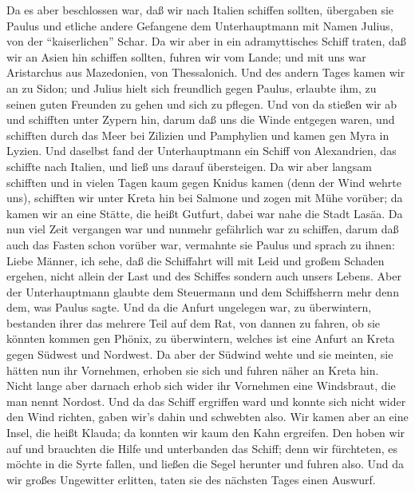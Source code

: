  Da es aber beschlossen war, daß wir nach Italien schiffen
sollten, übergaben sie Paulus und etliche andere Gefangene dem
Unterhauptmann mit Namen Julius, von der ``kaiserlichen'' Schar.
 Da wir aber in ein adramyttisches Schiff traten, daß wir an
Asien hin schiffen sollten, fuhren wir vom Lande; und mit uns war
Aristarchus aus Mazedonien, von Thessalonich.  Und des
andern Tages kamen wir an zu Sidon; und Julius hielt sich freundlich
gegen Paulus, erlaubte ihm, zu seinen guten Freunden zu gehen und sich
zu pflegen.  Und von da stießen wir ab und schifften unter
Zypern hin, darum daß uns die Winde entgegen waren,  und
schifften durch das Meer bei Zilizien und Pamphylien und kamen gen Myra
in Lyzien.  Und daselbst fand der Unterhauptmann ein Schiff
von Alexandrien, das schiffte nach Italien, und ließ uns darauf
übersteigen.  Da wir aber langsam schifften und in vielen
Tagen kaum gegen Knidus kamen (denn der Wind wehrte uns), schifften wir
unter Kreta hin bei Salmone  und zogen mit Mühe vorüber; da
kamen wir an eine Stätte, die heißt Gutfurt, dabei war nahe die Stadt
Lasäa.  Da nun viel Zeit vergangen war und nunmehr
gefährlich war zu schiffen, darum daß auch das Fasten schon vorüber war,
vermahnte sie Paulus  und sprach zu ihnen: Liebe Männer,
ich sehe, daß die Schiffahrt will mit Leid und großem Schaden ergehen,
nicht allein der Last und des Schiffes sondern auch unsers Lebens.
 Aber der Unterhauptmann glaubte dem Steuermann und dem
Schiffsherrn mehr denn dem, was Paulus sagte.  Und da die
Anfurt ungelegen war, zu überwintern, bestanden ihrer das mehrere Teil
auf dem Rat, von dannen zu fahren, ob sie könnten kommen gen Phönix, zu
überwintern, welches ist eine Anfurt an Kreta gegen Südwest und
Nordwest.  Da aber der Südwind wehte und sie meinten, sie
hätten nun ihr Vornehmen, erhoben sie sich und fuhren näher an Kreta
hin.  Nicht lange aber darnach erhob sich wider ihr
Vornehmen eine Windsbraut, die man nennt Nordost.  Und da
das Schiff ergriffen ward und konnte sich nicht wider den Wind richten,
gaben wir's dahin und schwebten also.  Wir kamen aber an
eine Insel, die heißt Klauda; da konnten wir kaum den Kahn ergreifen.
 Den hoben wir auf und brauchten die Hilfe und unterbanden
das Schiff; denn wir fürchteten, es möchte in die Syrte fallen, und
ließen die Segel herunter und fuhren also.  Und da wir
großes Ungewitter erlitten, taten sie des nächsten Tages einen Auswurf.
